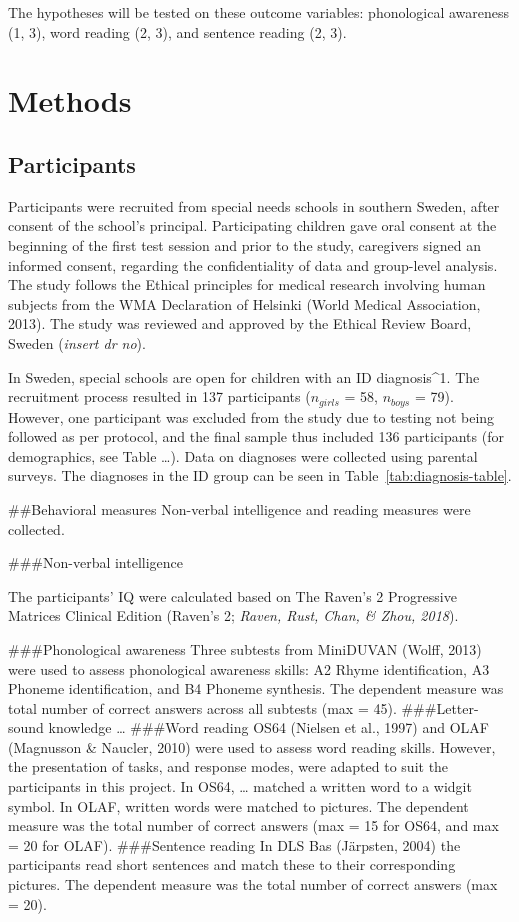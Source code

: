 \documentclass[
  english,
  ,man]{apa6}
\begin{document}
The hypotheses will be tested on these outcome variables: phonological awareness (1, 3), word reading (2, 3), and sentence reading (2, 3).

\hypertarget{methods}{%
\section{Methods}\label{methods}}

\hypertarget{participants}{%
\subsection{Participants}\label{participants}}

Participants were recruited from special needs schools in southern Sweden, after consent of the school's principal. Participating children gave oral consent at the beginning of the first test session and prior to the study, caregivers signed an informed consent, regarding the confidentiality of data and group-level analysis. The study follows the Ethical principles for medical research involving human subjects from the WMA Declaration of Helsinki (World Medical Association, 2013). The study was reviewed and approved by the Ethical Review Board, Sweden (\emph{insert dr no}).

In Sweden, special schools are open for children with an ID diagnosis\^{}1. The recruitment process resulted in 137 participants (\(n_{girls}\) = 58, \(n_{boys}\) = 79). However, one participant was excluded from the study due to testing not being followed as per protocol, and the final sample thus included 136 participants (for demographics, see Table \ldots). Data on diagnoses were collected using parental surveys. The diagnoses in the ID group can be seen in Table~\ref{tab:diagnosis-table}.

\#\#Behavioral measures
Non-verbal intelligence and reading measures were collected.

\#\#\#Non-verbal intelligence

The participants' IQ were calculated based on The Raven's 2 Progressive Matrices Clinical Edition (Raven's 2; \emph{Raven, Rust, Chan, \& Zhou, 2018}).

\#\#\#Phonological awareness
Three subtests from MiniDUVAN (Wolff, 2013) were used to assess phonological awareness skills: A2 Rhyme identification, A3 Phoneme identification, and B4 Phoneme synthesis. The dependent measure was total number of correct answers across all subtests (max = 45).
\#\#\#Letter-sound knowledge
\ldots{}
\#\#\#Word reading
OS64 (Nielsen et al., 1997) and OLAF (Magnusson \& Naucler, 2010) were used to assess word reading skills. However, the presentation of tasks, and response modes, were adapted to suit the participants in this project. In OS64, \ldots{} matched a written word to a widgit symbol. In OLAF, written words were matched to pictures. The dependent measure was the total number of correct answers (max = 15 for OS64, and max = 20 for OLAF).
\#\#\#Sentence reading
In DLS Bas (Järpsten, 2004) the participants read short sentences and match these to their corresponding pictures. The dependent measure was the total number of correct answers (max = 20).
\end{document}
